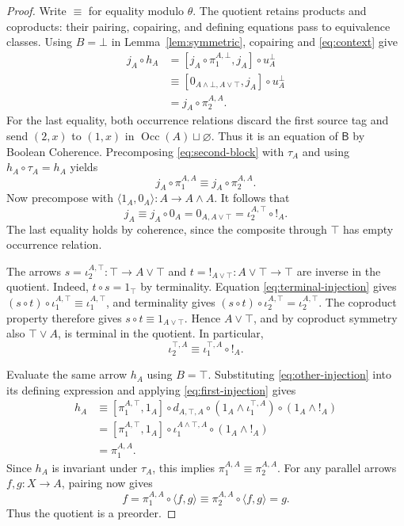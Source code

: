 \documentclass[11pt]{article}
\newcommand{\B}{\mathsf B}
\newcommand{\Occ}{\operatorname{Occ}}
\begin{document}
\begin{proof}
Write $\equiv$ for equality modulo $\theta$.
The quotient retains products and coproducts: their pairing,
copairing, and defining equations pass to equivalence classes.
Using $B=\bot$ in Lemma~\ref{lem:symmetric}, copairing and
\eqref{eq:context} give
\begin{equation}
 \begin{aligned}
 j_A\circ h_A
   &=[j_A\circ\pi_1^{A,\bot},j_A]\circ u_A^\bot\\
   &\equiv[0_{A\wedge\bot,A\vee\top},j_A]\circ u_A^\bot\\
   &=j_A\circ\pi_2^{A,A}.
 \end{aligned}
 \label{eq:second-block}
\end{equation}
For the last equality, both occurrence relations discard the first
source tag and send $(2,x)$ to $(1,x)$ in $\Occ(A)\sqcup\varnothing$.
Thus it is an equation of $\B$ by Boolean Coherence.
Precomposing \eqref{eq:second-block} with $\tau_A$ and using
$h_A\circ\tau_A=h_A$ yields
\[
 j_A\circ\pi_1^{A,A}\equiv j_A\circ\pi_2^{A,A}.
\]
Now precompose with $\langle1_A,0_A\rangle:A\to A\wedge A$.
It follows that
\begin{equation}
 j_A\equiv j_A\circ0_A
   =0_{A,A\vee\top}
   =\iota_2^{A,\top}\circ!_A.
 \label{eq:terminal-injection}
\end{equation}
The last equality holds by coherence, since the composite through
$\top$ has empty occurrence relation.

The arrows $s=\iota_2^{A,\top}:\top\to A\vee\top$ and
$t=!_{A\vee\top}:A\vee\top\to\top$ are inverse in the quotient.
Indeed, $t\circ s=1_\top$ by terminality. Equation
\eqref{eq:terminal-injection} gives
$(s\circ t)\circ\iota_1^{A,\top}\equiv\iota_1^{A,\top}$, and
terminality gives
$(s\circ t)\circ\iota_2^{A,\top}=\iota_2^{A,\top}$.
The coproduct property therefore gives $s\circ t\equiv1_{A\vee\top}$.
Hence $A\vee\top$, and by coproduct symmetry also $\top\vee A$,
is terminal in the quotient. In particular,
\begin{equation}
 \iota_2^{\top,A}\equiv\iota_1^{\top,A}\circ!_A.
 \label{eq:other-injection}
\end{equation}

Evaluate the same arrow $h_A$ using $B=\top$.
Substituting \eqref{eq:other-injection} into its defining expression
and applying \eqref{eq:first-injection} gives
\[
 \begin{aligned}
 h_A
   &\equiv[\pi_1^{A,\top},1_A]\circ d_{A,\top,A}
       \circ(1_A\wedge\iota_1^{\top,A})
       \circ(1_A\wedge!_A)\\
   &=[\pi_1^{A,\top},1_A]\circ\iota_1^{A\wedge\top,A}
       \circ(1_A\wedge!_A)\\
   &=\pi_1^{A,A}.
 \end{aligned}
\]
Since $h_A$ is invariant under $\tau_A$, this implies
$\pi_1^{A,A}\equiv\pi_2^{A,A}$.
For any parallel arrows $f,g:X\to A$, pairing now gives
\[
 f=\pi_1^{A,A}\circ\langle f,g\rangle
   \equiv\pi_2^{A,A}\circ\langle f,g\rangle=g.
\]
Thus the quotient is a preorder.
\end{proof}
\end{document}
